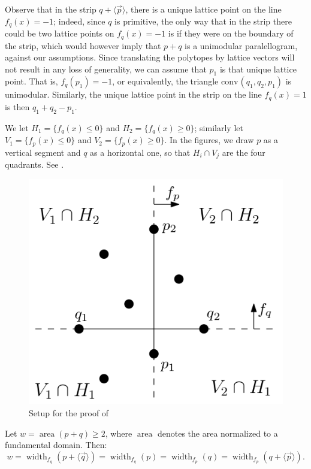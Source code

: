 \documentclass{amsart}
\theoremstyle{plain}
\theoremstyle{definition}
\newcommand{\width}{\operatorname{width}}
\newcommand{\area}{\operatorname{area}}
\renewcommand{\vec}[1]{\overrightarrow#1}
\newcommand{\vecline}[1]{\langle \vec #1 \rangle}
\newcommand{\conv}{\ensuremath{\mathrm{conv}}\hspace{1pt}}
\newcommand{\giulia}[1]{\todo[size=\tiny,color=blue!30]{#1 \\ \hfill --- G.}}
\newcommand{\paco}[1]{\todo[size=\tiny,color=green!30]{#1 \\ \hfill --- P.}}
\begin{document}
Observe that in the strip $q +\vecline p$, there is a unique lattice point on the line $f_q(x)=-1$;  indeed, since $q$ is primitive, the only way that in the strip there could be two lattice points on $f_q(x)=-1$ is if they were on the boundary of the strip, which would however imply that $p+q$ is a unimodular paralellogram, against our assumptions.
Since translating the polytopes by lattice vectors will not result in any loss of generality, we can assume that $p_1$ is that unique lattice point. That is, $f_q(p_1)=-1$, or equivalently, the triangle $\conv(q_1, q_2, p_1)$ is unimodular. Similarly, the unique lattice point in the strip on the line $f_q(x)=1$ is then $q_1+q_2 -p_1$.

We let $H_1=\{f_q(x) \leq 0\}$ and $H_2=\{f_q(x) \geq 0\}$; similarly let $V_1=\{f_p(x) \leq 0\}$ and $V_2=\{f_p(x) \geq 0\}$. 
In the figures, we draw $p$ as a vertical segment and $q$ as a horizontal one, so that $H_i \cap V_j$ are the four quadrants. 
See .
%
\begin{figure}[htb]
\includegraphics[scale=.3]{setup.png}
\caption{Setup for the proof of }
\label{fig:setup}
\end{figure}

Let $w=\area(p+q) \geq 2$, where $\area$ denotes the area normalized to a fundamental domain. Then:
\[
w=\width_{f_q}(p + \vecline q )=\width_{f_q}(p)=\width_{f_p}(q)=\width_{f_p}(q +\vecline p ). 
\] 
\end{document}
